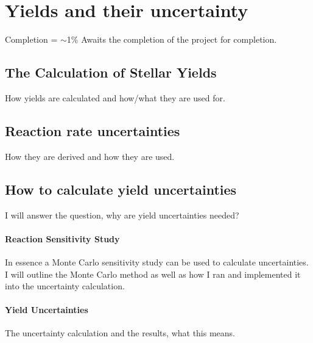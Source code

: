 \chapter{Yields and their uncertainty}

Completion = $\sim$1\%
Awaits the completion of the project for completion.

\section{The Calculation of Stellar Yields}

How yields are calculated and how/what they are used for.

\section{Reaction rate uncertainties}

How they are derived and how they are used.

\section{How to calculate yield uncertainties}

I will answer the question, why are yield uncertainties needed?

\subsubsection{Reaction Sensitivity Study}

In essence a Monte Carlo sensitivity study can be used to calculate uncertainties. I will outline the Monte Carlo method as well as how I ran and implemented it into the uncertainty calculation.

\subsubsection{Yield Uncertainties}

The uncertainty calculation and the results, what this means.
